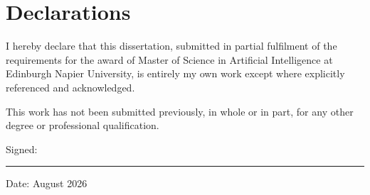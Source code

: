 \chapter*{Declarations}

I hereby declare that this dissertation, submitted in partial fulfilment of the requirements for the award of Master of Science in Artificial Intelligence at Edinburgh Napier University, is entirely my own work except where explicitly referenced and acknowledged. 

This work has not been submitted previously, in whole or in part, for any other degree or professional qualification.

\vspace{2cm}

\noindent Signed: \rule{6cm}{0.4pt}

\vspace{0.5cm}

\noindent Date: August 2026
